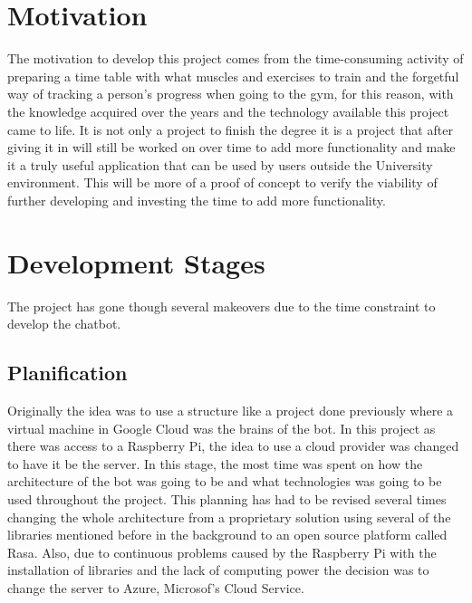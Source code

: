 \section{Motivation}\label{sec:chap1_moti}
The motivation to develop this project comes from the time-consuming activity of preparing a time table with what muscles and exercises to train and the forgetful way of tracking a person’s progress when going to the gym, for this reason, with the knowledge acquired over the years and the technology available this project came to life. It is not only a project to finish the degree it is a project that after giving it in will still be worked on over time to add more functionality and make it a truly useful application that can be used by users outside the University environment. This will be more of a proof of concept to verify the viability of further developing and investing the time to add more functionality.

\section{Development Stages}\label{sec:chap1_dev-stag}
The project has gone though several makeovers due to the time constraint to develop the chatbot. 
\subsection{Planification}\label{sec:chap1_plan}
Originally the idea was to use a structure like a project done previously where a virtual machine in Google Cloud was the brains of the bot. In this project as there was access to a Raspberry Pi, the idea to use a cloud provider was changed to have it be the server. 
In this stage, the most time was spent on how the architecture of the bot was going to be and what technologies was going to be used throughout the project. This planning has had to be revised several times changing the whole architecture from a proprietary solution using several of the libraries mentioned before in the background to an open source platform called Rasa. Also, due to continuous problems caused by the Raspberry Pi with the installation of libraries and the lack of computing power the decision was to change the server to Azure, Microsof’s Cloud Service.
